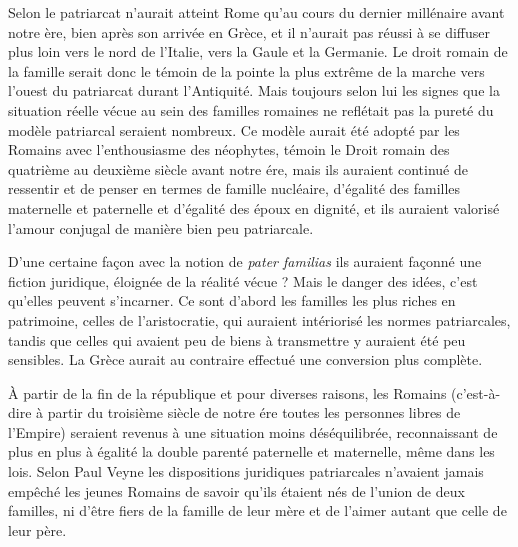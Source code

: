 Selon  le patriarcat n'aurait atteint Rome qu'au cours du dernier
millénaire avant notre ère, bien après son arrivée en Grèce, et il n'aurait
pas réussi à se diffuser plus loin vers le nord de l'Italie, vers la Gaule et
la Germanie. Le droit romain de la famille serait donc le témoin de la
pointe la plus extrême de la marche vers l'ouest du patriarcat durant
l'Antiquité.
Mais toujours selon lui  les signes que la situation réelle vécue
au sein des familles romaines ne reflétait pas la pureté du modèle patriarcal
seraient nombreux. Ce modèle aurait été adopté par les Romains avec
l'enthousiasme des néophytes, témoin le Droit romain des quatrième au deuxième siècle avant notre ére, mais ils auraient
continué de ressentir et de penser en termes de famille nucléaire,
d'égalité des familles maternelle et paternelle et d'égalité des époux en dignité,
et ils auraient valorisé l'amour conjugal de manière bien peu patriarcale. 

D'une certaine façon avec la notion de \emph{pater familias} ils auraient façonné une fiction juridique, éloignée de la réalité vécue ?  Mais le danger des idées, c'est qu'elles peuvent s'incarner. 
Ce sont d'abord les familles les plus riches en patrimoine,
celles de l'aristocratie, qui auraient intériorisé les normes patriarcales, tandis que celles
qui avaient peu de biens à transmettre y auraient été peu sensibles. La Grèce
aurait au contraire effectué une conversion plus complète.

À partir de la fin de la république et pour diverses raisons, les Romains
(c'est-à-dire à partir du troisième
siècle de notre ére toutes les personnes libres de l'Empire) seraient revenus à une situation moins déséquilibrée, reconnaissant
de plus en plus à égalité la double parenté paternelle et maternelle, même dans les lois. Selon Paul Veyne les dispositions juridiques patriarcales n'avaient jamais empêché les jeunes Romains de savoir qu'ils étaient nés de l'union de
deux familles, ni d'être fiers de la famille de leur mère et de l'aimer autant
que celle de leur père.

